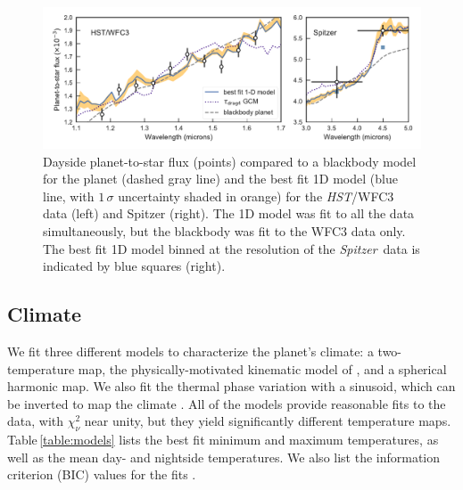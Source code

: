 \documentclass[twocolumn]{aastex61}
\newcommand{\project}[1]{\textsl{#1}}
\newcommand{\HST}{\project{HST}}
\newcommand{\Spitzer}{\project{Spitzer}}
\begin{document}
\begin{figure}
\includegraphics[width = 1.0\textwidth]{fig8.pdf}
\caption{Dayside planet-to-star flux (points) compared to a blackbody model for the planet (dashed gray line) and the best fit 1D model (blue line, with $1\,\sigma$ uncertainty shaded in orange) for the \HST/WFC3 data (left) and Spitzer (right). The 1D model was fit to all the data simultaneously, but the blackbody was fit to the WFC3 data only. The best fit 1D model binned at the resolution of the \Spitzer\ data is indicated by blue squares (right).} 
\label{fig:dayside}
\end{figure}


\subsection{Climate}
We fit three different models to characterize the planet's climate: a two-temperature map, the physically-motivated kinematic model of \cite{zhang17}, and a spherical harmonic map. We also fit the thermal phase variation with a sinusoid, which can be inverted to map the climate \citep{cowan08, cowan17}.  All of the models provide reasonable fits to the data, with $\chi^2_\nu$ near unity, but they yield significantly different temperature maps. Table\,\ref{table:models} lists the best fit minimum and maximum temperatures, as well as the mean day- and nightside temperatures. We also list the  information criterion (BIC) values for the fits \citep[a $\Delta$BIC value greater than 10 constitutes strong evidence against a given model;][]{kass95}.

\end{document}
